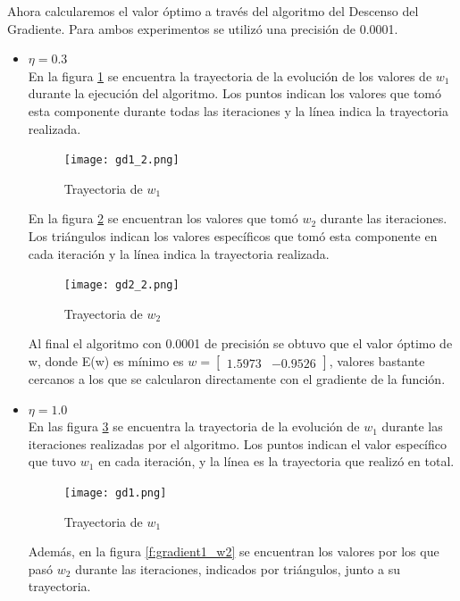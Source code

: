\documentclass[a4paper]{article}
\begin{document}
Ahora calcularemos el valor óptimo a través del algoritmo del Descenso del Gradiente. Para ambos experimentos se utilizó una precisión de 0.0001.
\begin{itemize}
\item $\eta = 0.3$\\
En la figura \ref{fig:gradient2_w1} se encuentra la trayectoria de la evolución de los valores de $w_{1}$ durante la ejecución del algoritmo. Los puntos indican los valores que tomó esta componente durante todas las iteraciones y la línea indica la trayectoria realizada.

	\begin{figure}[H]
	\centering
	\texttt{[image: gd1\_2.png]}
	\caption{Trayectoria de $w_{1}$}
	\label{fig:gradient2_w1}
	\end{figure}

En la figura \ref{f:gradient2_w2} se encuentran los valores que tomó $w_{2}$ durante las iteraciones. Los triángulos indican los valores específicos que tomó esta componente en cada iteración y la línea indica la trayectoria realizada.

	\begin{figure}[H]
	\centering
	\texttt{[image: gd2\_2.png]}
	\caption{Trayectoria de $w_{2}$}
	\label{f:gradient2_w2}
	\end{figure}
	
Al final el algoritmo con 0.0001 de precisión se obtuvo que el valor óptimo de w, donde E(w) es mínimo es $w = \left[\begin{array}{cc}
1.5973 & -0.9526
\end{array}\right]$, valores bastante cercanos a los que se calcularon directamente con el gradiente de la función.

\item $\eta = 1.0$\\
En las figura \ref{f:gradient1_w1} se encuentra la trayectoria de la evolución de $w_{1}$ durante las iteraciones realizadas por el algoritmo. Los puntos indican el valor específico que tuvo $w_{1}$ en cada iteración, y la línea es la trayectoria que realizó en total.

	\begin{figure}[H]
	\centering
	\texttt{[image: gd1.png]}
	\caption{Trayectoria de $w_{1}$}
	\label{f:gradient1_w1}
	\end{figure}

Además, en la figura \ref{f:gradient1_w2} se encuentran los valores por los que pasó $w_{2}$ durante las iteraciones, indicados por triángulos, junto a su trayectoria.


\end{itemize}
\end{document}
